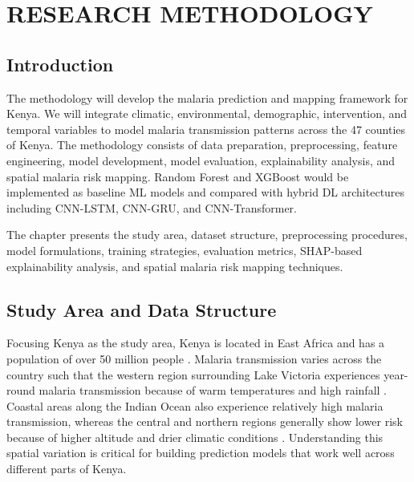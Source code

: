 \chapter{RESEARCH METHODOLOGY}

\section{Introduction}

The methodology will  develop the malaria prediction and mapping framework for Kenya. We will  integrate climatic, environmental, demographic, intervention, and temporal variables to model malaria transmission patterns across the 47 counties of Kenya. The methodology consists of data preparation, preprocessing, feature engineering, model development, model evaluation, explainability analysis, and spatial malaria risk mapping. Random Forest and XGBoost would  be implemented as baseline ML models and compared with hybrid DL architectures including CNN-LSTM, CNN-GRU, and CNN-Transformer.

The chapter presents the study area, dataset structure, preprocessing procedures, model formulations, training strategies, evaluation metrics, SHAP-based explainability analysis, and spatial malaria risk mapping techniques.

\section{Study Area and Data Structure}
\label{sec:study_area}
Focusing  Kenya as the study area, Kenya  is located in East Africa and has a population of over 50 million people \cite{WHO_malaria_2024}. Malaria transmission varies  across the country such that  the western region surrounding Lake Victoria experiences year-round malaria transmission because of warm temperatures and high rainfall \cite{amek2012spatial}. Coastal areas along the Indian Ocean also experience relatively high malaria transmission, whereas the central and northern regions generally show lower risk because of higher altitude and drier climatic conditions \cite{Snow2015}. Understanding this spatial variation  is critical for building prediction models that work well across different parts of Kenya.

